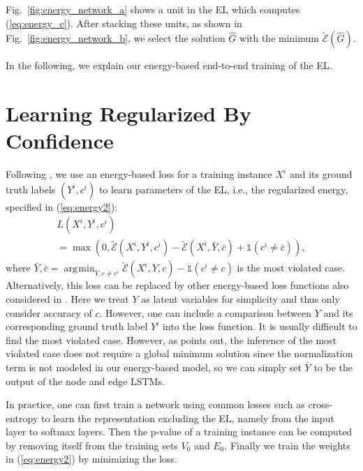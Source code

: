 \documentclass[10pt,twocolumn,letterpaper]{article}
\DeclareMathOperator*{\argmin}{\arg\!\min}
\begin{document}
Fig.~\ref{fig:energy_network_a} shows a unit in the EL which computes (\ref{eq:energy_c}). After stacking these units, as shown in Fig.~\ref{fig:energy_network_b}, we select the solution $\hat{G}$ with the minimum $\tilde{\mathcal{E}}(\hat{G})$.



In the following, we explain our energy-based end-to-end training of the EL.





\section{Learning Regularized By Confidence}\label{sec:learning}

Following \cite{LeCun2006, Belanger2016}, we use an energy-based loss for a training instance $X^i$ and its ground truth labels $(Y^i, c^i)$ to learn parameters of the EL, i.e., the regularized energy, specified in (\ref{eq:energy2}):
\begin{equation}
\begin{array}{l}
L(X^i,Y^i, c^i)\\= \max\left(0, \tilde{\mathcal{E}}(X^i, Y^i, c^i) - \tilde{\mathcal{E}}(X^i, \bar{Y}, \bar{c}) +  \mathds{1}(c^{i} \neq \bar{c})\right),
\end{array}
\label{eq:loss}
\end{equation}
where $\bar{Y}, \bar{c} = \argmin_{Y, c\neq c^i}\tilde{\mathcal{E}}(X^i,Y, c) -  \mathds{1}(c^{i} \neq c)$ is the most violated case. Alternatively, this loss can be replaced by other energy-based loss functions also considered in \cite{LeCun2006}. Here we treat $Y$ as latent variables for simplicity and thus only consider accuracy of $c$. However, one can include a comparison between $Y$ and its corresponding ground truth label $Y^i$ into the loss function. It is usually difficult to find the most violated case. However, as \cite{LeCun2005} points out, the inference of the most violated case does not require a global minimum solution since the normalization term is not modeled in our energy-based model, so we can simply set $\bar{Y}$ to be the output of the node and edge LSTMs.  %


In practice, one can first train a network using common losses such as cross-entropy to learn the representation excluding the EL, namely from the input layer to softmax layers. Then the p-value of a training instance can be computed by removing itself from the training sets $V_0$ and $E_0$. Finally we train the weights in (\ref{eq:energy2}) by minimizing the loss.
\end{document}
